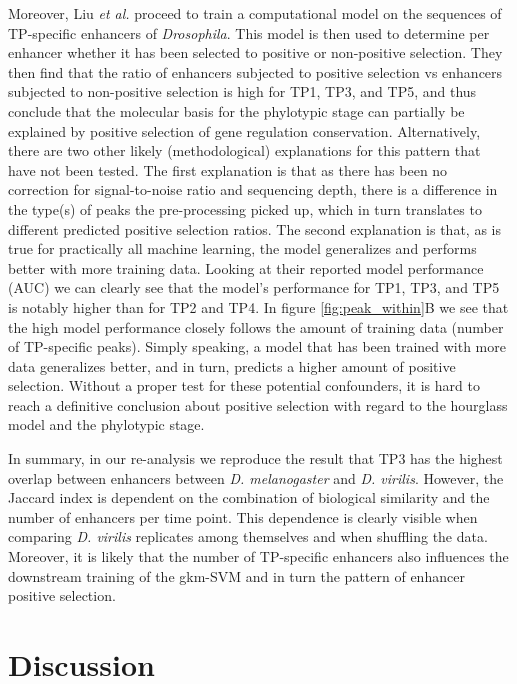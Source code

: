 Moreover, Liu \textit{et al.} proceed to train a computational model on the sequences of TP-specific enhancers of \textit{Drosophila}. This model is then used to determine per enhancer whether it has been selected to positive or non-positive selection. They then find that the ratio of enhancers subjected to positive selection vs enhancers subjected to non-positive selection is high for TP1, TP3, and TP5, and thus conclude that the molecular basis for the phylotypic stage can partially be explained by positive selection of gene regulation conservation. Alternatively, there are two other likely (methodological) explanations for this pattern that have not been tested. The first explanation is that as there has been no correction for signal-to-noise ratio and sequencing depth, there is a difference in the type(s) of peaks the pre-processing picked up, which in turn translates to different predicted positive selection ratios\cite{encode_guidelines2012,Whalen2021}. The second explanation is that, as is true for practically all machine learning, the model generalizes and performs better with more training data. Looking at their reported model performance (AUC) we can clearly see that the model's performance for TP1, TP3, and TP5 is notably higher than for TP2 and TP4. In figure \ref{fig:peak_within}B we see that the high model performance closely follows the amount of training data (number of TP-specific peaks). Simply speaking, a model that has been trained with more data generalizes better, and in turn, predicts a higher amount of positive selection. Without a proper test for these potential confounders, it is hard to reach a definitive conclusion about positive selection with regard to the hourglass model and the phylotypic stage.

In summary, in our re-analysis we reproduce the result that TP3 has the highest overlap between enhancers between \textit{D. melanogaster} and \textit{D. virilis}. However, the Jaccard index is dependent on the combination of biological similarity and the number of enhancers per time point. This dependence is clearly visible when comparing \textit{D. virilis} replicates among themselves and when shuffling the data. Moreover, it is likely that the number of TP-specific enhancers also influences the downstream training of the gkm-SVM and in turn the pattern of enhancer positive selection. 

\section{Discussion}

